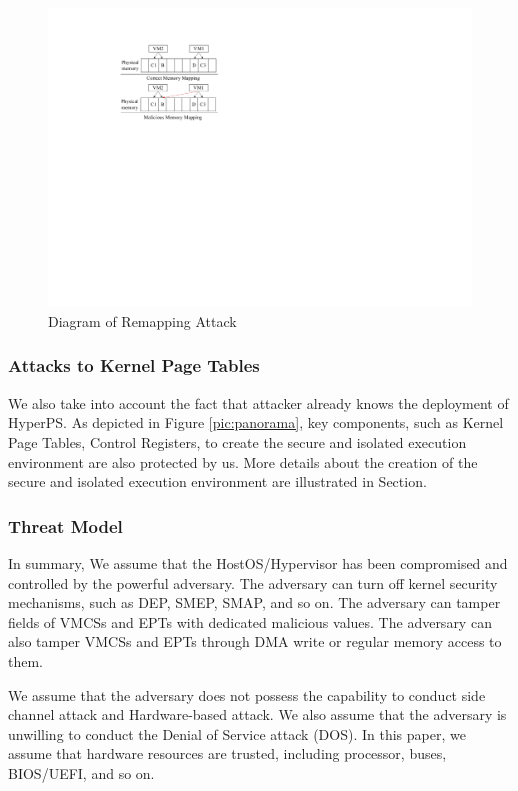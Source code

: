 \begin{figure}
    \centering
    \includegraphics{IMG/remap.pdf}
    \caption{Diagram of Remapping Attack}
    \label{pic:remap}
\end{figure}

\subsubsection{Attacks to Kernel Page Tables}
We also take into account the fact that attacker already knows the deployment of HyperPS. As depicted in Figure \ref{pic:panorama}, key components, such as Kernel Page Tables, Control Registers, to create the secure and isolated execution environment are also protected by us. More details about the creation of the secure and isolated execution environment are illustrated in Section. 
 
\subsubsection{Threat Model}
In summary, 
We assume that the HostOS/Hypervisor has been compromised and controlled by the powerful adversary. The adversary can turn off kernel security mechanisms, such as DEP, SMEP, SMAP, and so on. The adversary can tamper fields of VMCSs and EPTs with dedicated malicious values. The adversary can also tamper VMCSs and EPTs through DMA write or regular memory access to them.  

We assume that the adversary does not possess the capability to conduct side channel attack and Hardware-based attack. We also assume that the adversary is unwilling to conduct the Denial of Service attack (DOS). In this paper, we assume that hardware resources are trusted, including processor, buses, BIOS/UEFI, and so on. 


















